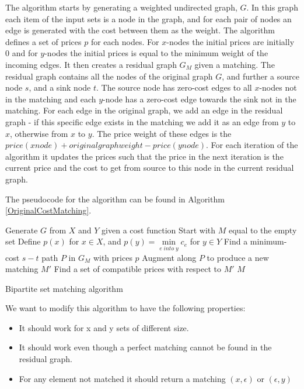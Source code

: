 \documentclass[11pt]{article}
\begin{document}
The \citet{bipartitecost} algorithm starts by generating a weighted undirected graph, $G$. In this graph each item of the input sets is a node in the graph, and for each pair of nodes an edge is generated with the cost between them as the weight. The algorithm defines a set of prices $p$ for each nodes. For $x$-nodes the initial prices are initially 0 and for $y$-nodes the initial prices is equal to the minimum weight of the incoming edges. It then creates a residual graph $G_M$ given a matching. The residual graph contains all the nodes of the original graph $G$, and further a source node $s$, and a sink node $t$. The source node has zero-cost edges to all $x$-nodes not in the matching and each $y$-node has a zero-cost edge towards the sink not in the matching. For each edge in the original graph, we add an edge in the residual graph - if this specific edge exists in the matching we add it as an edge from $y$ to $x$, otherwise from $x$ to $y$. The price weight of these edges is the $price(xnode)+originalgraphweight-price(ynode)$. For each iteration of the algorithm it updates the prices such that the price in the next iteration is the current price and the cost to get from source to this node in the current residual graph.

The pseudocode for the algorithm can be found in Algorithm \ref{OriginalCostMatching}.


\begin{algorithm}
\begin{algorithmic}
	\State Generate $G$ from $X$ and $Y$ given a cost function
	\State Start with $M$ equal to the empty set
	\State Define $p(x)$ for $x \in X$, and  $p(y) = \underset{e \; into \; y}{\operatorname{min}} c_e$ for $y \in Y$
    	\State Find a minimum-cost $s-t$ path $P$ in $G_M$ with prices $p$
    	\State Augment along $P$ to produce a new matching $M'$
    	\State Find a set of compatible prices with respect to $M'$
    \EndWhile
	\State \Return $M$
\EndFunction
\end{algorithmic}
	\caption{Bipartite set matching algorithm}
	\label{OriginalCostMatching}
\end{algorithm}

We want to modify this algorithm to have the following properties:

\begin{itemize}
\item It should work for x and y sets of different size. 
\item It should work even though a perfect matching cannot be found in the residual graph.
\item For any element not matched it should return a matching $(x, \epsilon)$ or $(\epsilon, y)$
\end{itemize}
\end{document}
